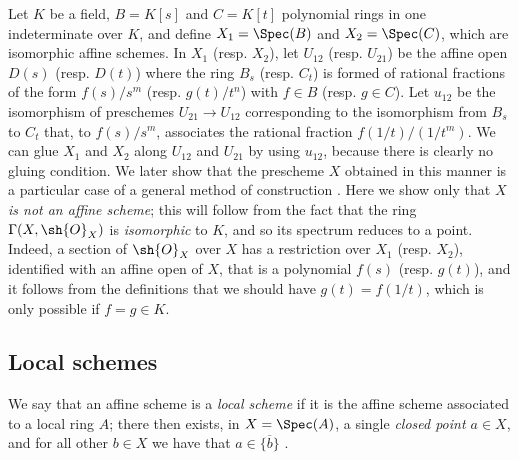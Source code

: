 \begin{example}[2.3.2]
\label{I.2.3.2}
Let $K$ be a field, $B=K[s]$ and $C=K[t]$ polynomial rings in one indeterminate over $K$, and define $X_1=\Spec(B)$ and $X_2=\Spec(C)$, which are isomorphic affine schemes.
In $X_1$ (resp. $X_2$), let $U_{12}$ (resp. $U_{21}$) be the affine open $D(s)$ (resp. $D(t)$) where the ring $B_s$ (resp. $C_t$) is formed of rational fractions of the form $f(s)/s^m$ (resp. $g(t)/t^n$) with $f\in B$ (resp. $g\in C$).
Let $u_{12}$ be the isomorphism of preschemes $U_{21}\to U_{12}$ corresponding  to the isomorphism from $B_s$ to $C_t$ that, to $f(s)/s^m$, associates the rational fraction $f(1/t)/(1/t^m)$.
We can glue $X_1$ and $X_2$ along $U_{12}$ and $U_{21}$ by using $u_{12}$, because there is clearly no gluing condition.
We later show that the prescheme $X$ obtained in this manner is a particular case of a general method of construction .
Here we show only that $X$ \emph{is not an affine scheme};
this will follow from the fact that the ring $\Gamma(X,\sh{O}_X)$ is \emph{isomorphic} to $K$, and so its spectrum reduces to a point.
Indeed, a section of $\sh{O}_X$ over $X$ has a restriction over $X_1$ (resp. $X_2$), identified with an affine open of $X$, that is a polynomial $f(s)$ (resp. $g(t)$), and it follows from the definitions that we should have $g(t)=f(1/t)$, which is only possible if $f=g\in K$.
\end{example}

\subsection{Local schemes}
\label{subsection:I.2.4}

\begin{env}[2.4.1]
\label{I.2.4.1}
We say that an affine scheme is a \emph{local scheme} if it is the affine scheme associated to a local ring $A$;
there then exists, in $X=\Spec(A)$, a single \emph{closed point $a\in X$}, and for all other $b\in X$ we have that $a\in\overline{\{b\}}$ .
\end{env}

